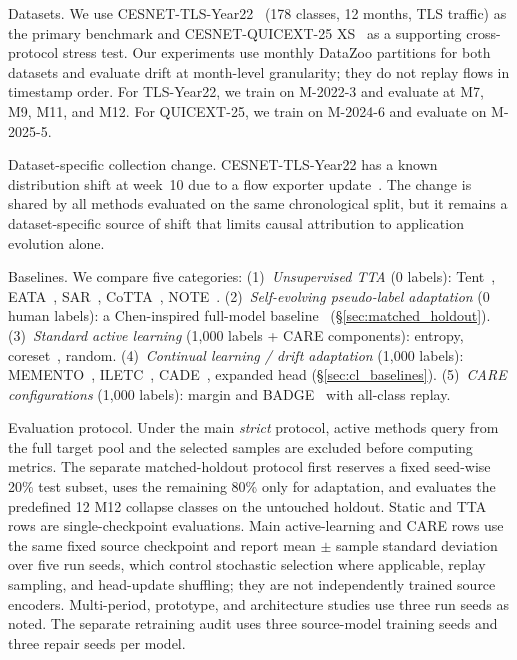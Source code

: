 \documentclass[journal]{IEEEtran}
\newcommand{\ours}{CARE}  %
\begin{document}
Datasets.
We use CESNET-TLS-Year22~\cite{hynek2024cesnet} (178 classes, 12 months, TLS traffic) as the primary benchmark and CESNET-QUICEXT-25 XS~\cite{cesnetquicext25,mucke2025waiting} as a supporting cross-protocol stress test.
Our experiments use monthly DataZoo partitions for both datasets and evaluate drift at month-level granularity; they do not replay flows in timestamp order.
For TLS-Year22, we train on M-2022-3 and evaluate at M7, M9, M11, and M12.
For QUICEXT-25, we train on M-2024-6 and evaluate on M-2025-5.

Dataset-specific collection change.
CESNET-TLS-Year22 has a known distribution shift at week~10 due to a flow exporter update~\cite{hynek2024cesnet}.
The change is shared by all methods evaluated on the same chronological split, but it remains a dataset-specific source of shift that limits causal attribution to application evolution alone.

Baselines.
We compare five categories:
(1)~\textit{Unsupervised TTA} (0 labels): Tent~\cite{wang2021tent}, EATA~\cite{niu2022eata}, SAR~\cite{niu2023sar}, CoTTA~\cite{wang2022cotta}, NOTE~\cite{gong2022note}.
(2)~\textit{Self-evolving pseudo-label adaptation} (0 human labels): a Chen-inspired full-model baseline~\cite{chen2025selfevolving} (\S\ref{sec:matched_holdout}).
(3)~\textit{Standard active learning} (1{,}000 labels + \ours{} components): entropy, coreset~\cite{sener2018coreset}, random.
(4)~\textit{Continual learning / drift adaptation} (1{,}000 labels): MEMENTO~\cite{cerasuolo2024memento}, ILETC~\cite{zhu2023iletc}, CADE~\cite{yang2021cade}, expanded head (\S\ref{sec:cl_baselines}).
(5)~\textit{\ours{} configurations} (1{,}000 labels): margin and BADGE~\cite{ash2020badge} with all-class replay.

Evaluation protocol.
Under the main \textit{strict} protocol, active methods query from the full target pool and the selected samples are excluded before computing metrics. The separate matched-holdout protocol first reserves a fixed seed-wise 20\% test subset, uses the remaining 80\% only for adaptation, and evaluates the predefined 12 M12 collapse classes on the untouched holdout.
Static and TTA rows are single-checkpoint evaluations.
Main active-learning and \ours{} rows use the same fixed source checkpoint and report mean $\pm$ sample standard deviation over five run seeds, which control stochastic selection where applicable, replay sampling, and head-update shuffling; they are not independently trained source encoders.
Multi-period, prototype, and architecture studies use three run seeds as noted.
The separate retraining audit uses three source-model training seeds and three repair seeds per model.
\end{document}
